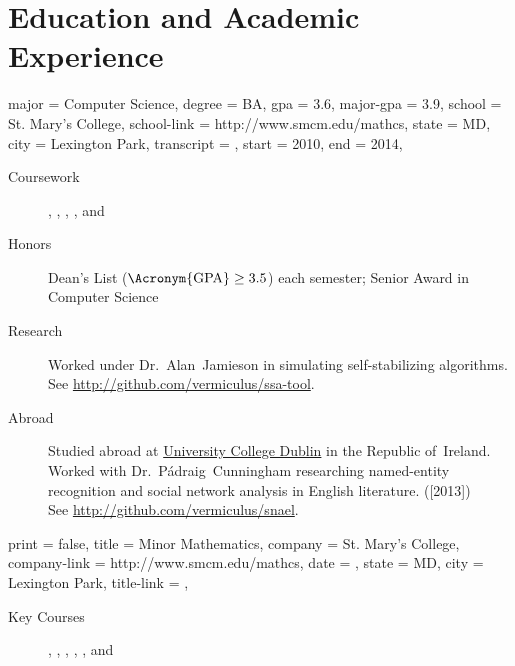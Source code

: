 \documentclass{simplecv}
\begin{document}
\section{Education and Academic Experience}
\begin{education}
  {
    major = Computer Science,
    degree = BA,
    gpa = 3.6,
    major-gpa = 3.9,
    school = St. Mary's College,
    school-link = http://www.smcm.edu/mathcs,
    state = MD,
    city = Lexington Park,
    transcript = \transcript,
    start = 2010,
    end = 2014,
  }

\begin{description}
\item[Coursework]
  ,
  ,
  ,
  ,
  and
\item[Honors] Dean's List ($\text{\Acronym{GPA}} \geq 3.5$) each semester;
  Senior Award in Computer Science
\item[Research] Worked under Dr.~Alan~Jamieson in simulating
  self-stabilizing algorithms.
  \\
  See \url{http://github.com/vermiculus/ssa-tool}.
\item[Abroad] Studied abroad at \href{http://www.ucd.ie}{University College Dublin} in the Republic of~Ireland.
  Worked with Dr.~P\'adraig~Cunningham researching named-entity recognition and social network
  analysis in English literature. ([2013])
  \\
  See \url{http://github.com/vermiculus/snael}.
\end{description}
\end{education}

\begin{position}
  {
    print   = false,
    title   = Minor \Dash Mathematics,
    company = St. Mary's College,
    company-link = http://www.smcm.edu/mathcs,
    date    = ,
    state   = MD,
    city    = Lexington Park,
    title-link = \transcript,
  }

  \begin{description}
  \item[Key Courses]
    ,
    ,
    ,
    ,
    ,
    and
  \end{description}
\end{position}
\end{document}
